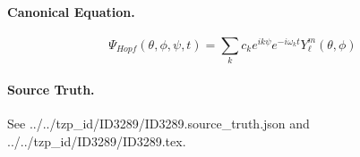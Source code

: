 \paragraph{Canonical Equation.}
\[
\begin{equation} \Psi_{Hopf}( \theta, \phi, \psi, t) = \sum_{k} c_k e^{ik \psi} e^{-i \omega_k t} Y_{ \ell}^m( \theta, \phi) \end{equation}
\]

\paragraph{Source Truth.}
See ../../tzp\_id/ID3289/ID3289.source\_truth.json and ../../tzp\_id/ID3289/ID3289.tex.
